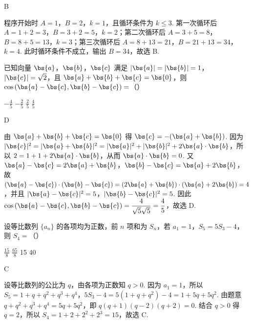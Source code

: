 \begin{answer}
B
\end{answer}

\begin{solution}
程序开始时 \(A=1\)，\(B=2\)，\(k=1\)，且循环条件为 \(k\leq 3\). 第一次循环后
\(A=1+2=3\)，\(B=3+2=5\)，\(k=2\)；第二次循环后
\(A=3+5=8\)，\(B=8+5=13\)，\(k=3\)；第三次循环后
\(A=8+13=21\)，\(B=21+13=34\)，\(k=4\). 此时循环条件不成立，输出 \(B=34\)，故选 B.
\end{solution}

\begin{problem}
已知向量 \(\bs{a}\)，\(\bs{b}\)，\(\bs{c}\) 满足 \( \lvert \bs{a} \rvert=\lvert \bs{b} \rvert=1 \)，\( \lvert \bs{c} \rvert=\sqrt{2} \)，且 \( \bs{a}+\bs{b}+\bs{c}=\bs{0} \)，则 \( \cos\left( \bs{a}-\bs{c},\bs{b}-\bs{c} \right)= \)（\quad）

\choices
    {\(-\frac45\)}
    {\(-\frac25\)}
    {\(\frac25\)}
    {\(\frac45\)}
\end{problem}

\begin{answer}
D
\end{answer}

\begin{solution}
由 \(\bs{a}+\bs{b}+\bs{c}=\bs{0}\) 得 \(\bs{c}=-(\bs{a}+\bs{b})\). 因为
\(\lvert\bs{c}\rvert^2=\lvert\bs{a}+\bs{b}\rvert^2=\lvert\bs{a}\rvert^2+\lvert\bs{b}\rvert^2+2\bs{a}\cdot\bs{b}\)，所以
\(2=1+1+2\bs{a}\cdot\bs{b}\)，从而 \(\bs{a}\cdot\bs{b}=0\). 又
\(\bs{a}-\bs{c}=2\bs{a}+\bs{b}\)，\(\bs{b}-\bs{c}=\bs{a}+2\bs{b}\)，故
\((\bs{a}-\bs{c})\cdot(\bs{b}-\bs{c})=(2\bs{a}+\bs{b})\cdot(\bs{a}+2\bs{b})=4\)，并且
\(\lvert\bs{a}-\bs{c}\rvert^2=5\)，\(\lvert\bs{b}-\bs{c}\rvert^2=5\). 因此
\(\cos\left(\bs{a}-\bs{c},\bs{b}-\bs{c}\right)=\dfrac{4}{\sqrt5\sqrt5}=\dfrac45\)，故选 D.
\end{solution}

\begin{problem}
设等比数列 \( \{a_n\} \) 的各项均为正数，前 \( n \) 项和为 \( S_n \)，若 \( a_1=1 \)，\( S_5=5S_3-4 \)，则 \( S_4= \)（\quad）

\choices
    {\(\frac{15}{8}\)}
    {\(\frac{65}{8}\)}
    {15}
    {40}
\end{problem}

\begin{answer}
C
\end{answer}

\begin{solution}
设等比数列的公比为 \(q\)，由各项为正数知 \(q>0\). 因为 \(a_1=1\)，所以
\(S_5=1+q+q^2+q^3+q^4\)，\(5S_3-4=5(1+q+q^2)-4=1+5q+5q^2\). 由题意
\(q+q^2+q^3+q^4=5q+5q^2\)，即
\(q(q+1)(q-2)(q+2)=0\). 结合 \(q>0\) 得 \(q=2\)，所以
\(S_4=1+2+2^2+2^3=15\)，故选 C.
\end{solution}

